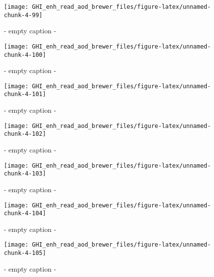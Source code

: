 \documentclass[
  10pt,
  a4paper,oneside]{article}
\begin{document}
\begin{figure}[H]

{\centering \texttt{[image: GHI\_enh\_read\_aod\_brewer\_files/figure-latex/unnamed-chunk-4-99]} 

}

\caption{ - empty caption - }\label{fig:unnamed-chunk-4-99}
\end{figure}
\begin{figure}[H]

{\centering \texttt{[image: GHI\_enh\_read\_aod\_brewer\_files/figure-latex/unnamed-chunk-4-100]} 

}

\caption{ - empty caption - }\label{fig:unnamed-chunk-4-100}
\end{figure}
\begin{figure}[H]

{\centering \texttt{[image: GHI\_enh\_read\_aod\_brewer\_files/figure-latex/unnamed-chunk-4-101]} 

}

\caption{ - empty caption - }\label{fig:unnamed-chunk-4-101}
\end{figure}
\begin{figure}[H]

{\centering \texttt{[image: GHI\_enh\_read\_aod\_brewer\_files/figure-latex/unnamed-chunk-4-102]} 

}

\caption{ - empty caption - }\label{fig:unnamed-chunk-4-102}
\end{figure}
\begin{figure}[H]

{\centering \texttt{[image: GHI\_enh\_read\_aod\_brewer\_files/figure-latex/unnamed-chunk-4-103]} 

}

\caption{ - empty caption - }\label{fig:unnamed-chunk-4-103}
\end{figure}
\begin{figure}[H]

{\centering \texttt{[image: GHI\_enh\_read\_aod\_brewer\_files/figure-latex/unnamed-chunk-4-104]} 

}

\caption{ - empty caption - }\label{fig:unnamed-chunk-4-104}
\end{figure}
\begin{figure}[H]

{\centering \texttt{[image: GHI\_enh\_read\_aod\_brewer\_files/figure-latex/unnamed-chunk-4-105]} 

}

\caption{ - empty caption - }\label{fig:unnamed-chunk-4-105}
\end{figure}
\end{document}
